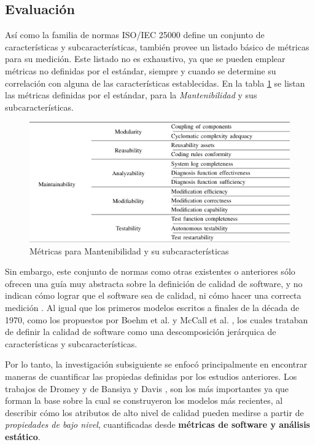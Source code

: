 \subsection{Evaluación}

Así como la familia de normas ISO/IEC 25000 define un conjunto de características y
subcaracterísticas, también provee un listado básico de métricas para su medición.
Este listado no es exhaustivo, ya que se pueden emplear métricas no definidas por el
estándar, siempre y cuando se determine su correlación con alguna de las características
establecidas.
En la tabla \ref{Metrics} se listan las métricas definidas por el estándar, para la \textit{Mantenibilidad}
y sus subcaracterísticas.

\begin{figure}
    \label{Metrics}
    \includegraphics[width=12cm]{quality_metrics/quality_metrics.png}
    \centering
    \caption{Métricas para Mantenibilidad y su subcaracterísticas}
\end{figure}

Sin embargo, este conjunto de normas como otras existentes o anteriores sólo ofrecen una
guía muy abstracta sobre la definición de calidad de software, y no indican cómo lograr
que el software sea de calidad, ni cómo hacer una correcta medición \cite{Relf04}.
Al igual que los primeros modelos escritos a finales de la década de 1970, como los
propuestos por Boehm et al. \cite{Boehm1978} y McCall et al. \cite{McCall1977}, los cuales trataban
de definir la calidad de software como una descomposición jerárquica de características y
subcaracterísticas.

Por lo tanto, la investigación subsiguiente se enfocó principalmente en encontrar maneras de
cuantificar las propiedas definidas por los estudios anteriores.
Los trabajos de Dromey \cite{Dromey1995} y de Bansiya y Davis \cite{Bansiya2002}, son los más 
importantes ya que forman la base sobre la cual se construyeron los modelos más recientes, al 
describir cómo los atributos de alto nivel de calidad pueden medirse a partir de \textit{propiedades
de bajo nivel}, cuantificadas desde \textbf{métricas de software y análisis estático}.

